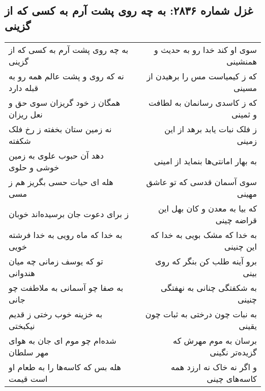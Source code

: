 \begin{center}
\section*{غزل شماره ۲۸۳۶: به چه روی پشت آرم به کسی که از گزینی}
\label{sec:2836}
\begin{longtable}{l p{0.5cm} r}
به چه روی پشت آرم به کسی که از گزینی
&&
سوی او کند خدا رو به حدیث و همنشینی
\\
نه که روی و پشت عالم همه رو به قبله دارد
&&
که ز کیمیاست مس را برهیدن از مسینی
\\
همگان ز خود گریزان سوی حق و نعل ریزان
&&
که ز کاسدی رسانمان به لطافت و ثمینی
\\
نه زمین ستان بخفته ز رخ فلک شکفته
&&
ز فلک نبات یابد برهد از این زمینی
\\
دهد آن حبوب علوی به زمین خوشی و حلوی
&&
به بهار امانتی‌ها بنماید از امینی
\\
هله ای حیات حسی بگریز هم ز مسی
&&
سوی آسمان قدسی که تو عاشق مهینی
\\
ز برای دعوت جان برسیده‌اند خوبان
&&
که بیا به معدن و کان بهل این قراضه چینی
\\
به خدا که ماه رویی به خدا فرشته خویی
&&
به خدا که مشک بویی به خدا که این چنینی
\\
تو که یوسف زمانی چه میان هندوانی
&&
برو آینه طلب کن بنگر که روی بینی
\\
به صفا چو آسمانی به ملاطفت چو جانی
&&
به شکفتگی چنانی به نهفتگی چنینی
\\
به خزینه خوب رختی ز قدیم نیکبختی
&&
به نبات چون درختی به ثبات چون یقینی
\\
شده‌ام چو موم ای جان به هوای مهر سلطان
&&
برسان به موم مهرش که گزیده‌تر نگینی
\\
هله بس که کاسه‌ها را به طعام او است قیمت
&&
و اگر نه خاک نه ارزد همه کاسه‌های چینی
\\
\end{longtable}
\end{center}
